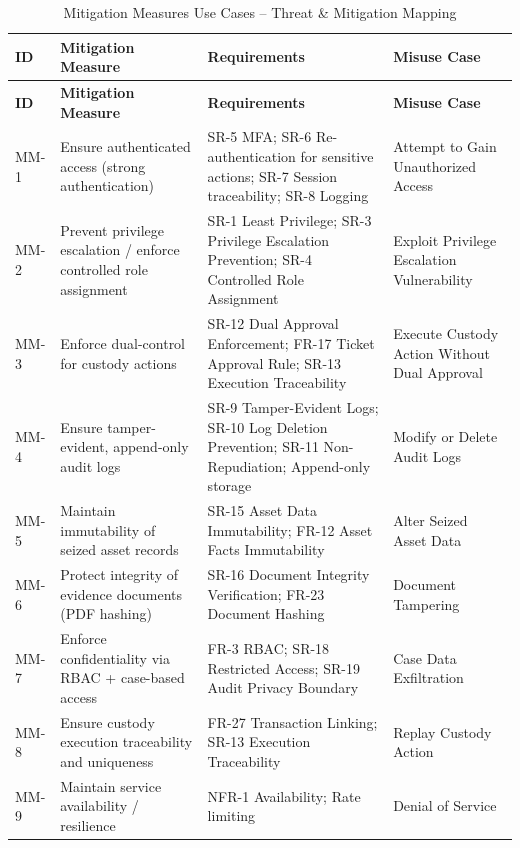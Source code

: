 \documentclass[12pt,a4paper]{report}
\begin{document}
\begin{longtable}{|p{1.2cm}|p{4.2cm}|p{4.8cm}|p{3.5cm}|}

\caption{Mitigation Measures Use Cases -- Threat \& Mitigation Mapping}
\label{tab:mitigation-mapping} \\

\hline
\textbf{ID} & \textbf{Mitigation Measure } & \textbf{Requirements} & \textbf{Misuse Case} \\
\hline
\endfirsthead

\hline
\textbf{ID} & \textbf{Mitigation Measure } & \textbf{Requirements} & \textbf{Misuse Case} \\
\hline
\endhead

MM-1 & Ensure authenticated access (strong authentication) & SR-5 MFA; SR-6 Re-authentication for sensitive actions; SR-7 Session traceability; SR-8 Logging & Attempt to Gain Unauthorized Access \\
\hline

MM-2 & Prevent privilege escalation / enforce controlled role assignment & SR-1 Least Privilege; SR-3 Privilege Escalation Prevention; SR-4 Controlled Role Assignment & Exploit Privilege Escalation Vulnerability \\
\hline

MM-3 & Enforce dual-control for custody actions & SR-12 Dual Approval Enforcement; FR-17 Ticket Approval Rule; SR-13 Execution Traceability & Execute Custody Action Without Dual Approval \\
\hline

MM-4 & Ensure tamper-evident, append-only audit logs & SR-9 Tamper-Evident Logs; SR-10 Log Deletion Prevention; SR-11 Non-Repudiation; Append-only storage & Modify or Delete Audit Logs \\
\hline

MM-5 & Maintain immutability of seized asset records & SR-15 Asset Data Immutability; FR-12 Asset Facts Immutability & Alter Seized Asset Data \\
\hline

MM-6 & Protect integrity of evidence documents (PDF hashing) & SR-16 Document Integrity Verification; FR-23 Document Hashing & Document Tampering \\
\hline

MM-7 & Enforce confidentiality via RBAC + case-based access & FR-3 RBAC; SR-18 Restricted Access; SR-19 Audit Privacy Boundary & Case Data Exfiltration \\
\hline

MM-8 & Ensure custody execution traceability and uniqueness & FR-27 Transaction Linking; SR-13 Execution Traceability & Replay Custody Action \\
\hline

MM-9 & Maintain service availability / resilience & NFR-1 Availability; Rate limiting & Denial of Service \\
\hline

\end{longtable}
\end{document}
